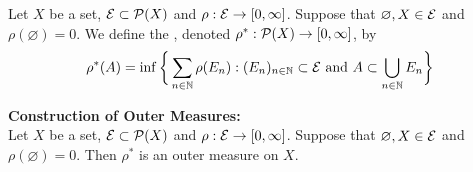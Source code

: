 \documentclass{book}
\begin{document}
	\begin{defn}   
		Let $X$ be a set, $\mathcal{E} \subset \mathcal{P}(X)$ and $\rho: \mathcal{E} \rightarrow [0, \infty]$. Suppose that $\varnothing, X \in \mathcal{E}$ and $\rho(\varnothing) = 0$. We define the , denoted $\rho^*:\mathcal{P}(X) \rightarrow [0, \infty]$, by 
		$$\rho^*(A) = \inf \bigg \{\sum\limits_{n \in \mathbb{N}}\rho(E_n): (E_n)_{n \in \mathbb{N}} \subset \mathcal{E} \text{ and }A \subset \bigcup_{n \in \mathbb{N}}E_n \bigg \}$$ 
	\end{defn}
	
	\begin{ex}\textbf{Construction of Outer Measures:}    \\
		Let $X$ be a set, $\mathcal{E} \subset \mathcal{P}(X)$ and $\rho: \mathcal{E} \rightarrow [0, \infty]$. Suppose that $\varnothing, X \in \mathcal{E}$ and $\rho(\varnothing) = 0$. Then $\rho^*$ is an outer measure on $X$.
	\end{ex}
	
\end{document}
